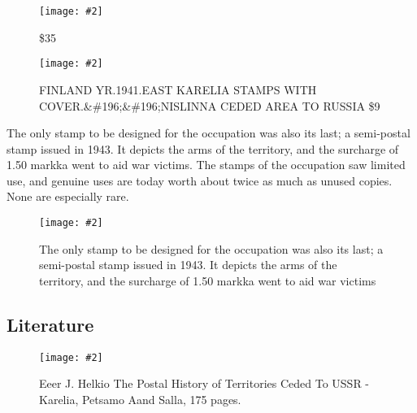 \documentclass[10pt,justified,oneside,a4paper]{tufte-book}     %
\newcommand{\ph}[3][1]{%
 \begin{figure}[htbp]
   \centering
   \texttt{[image: \#2]}%
    \caption{#3 }
 \end{figure}}
\begin{document}
\ph[width=.60\textwidth]{../eastern-karelia/eastern-karelia-stamps.jpg}{\$35 }

\ph[width=.60\textwidth]{../eastern-karelia/eastern-karelia-cover.jpg}{FINLAND YR.1941.EAST KARELIA STAMPS WITH COVER.&\#196;&\#196;NISLINNA CEDED AREA TO RUSSIA \$9}

The only stamp to be designed for the occupation was also its last; a semi-postal stamp issued in 1943. It depicts the arms of the territory, and the surcharge of 1.50 markka went to aid war victims.
The stamps of the occupation saw limited use, and genuine uses are today worth about twice as much as unused copies. None are especially rare.

\ph[width=.25\textwidth]{../eastern-karelia/semi-postal.jpg}{The only stamp to be designed for the occupation was also its last; a semi-postal stamp issued in 1943. It depicts the arms of the territory, and the surcharge of 1.50 markka went to aid war victims }

\subsection{Literature}

\ph[width=.35\textwidth]{../eastern-karelia/reference.jpg}{Eeer J. Helkio 
The Postal History of Territories Ceded 
To USSR - Karelia, Petsamo Aand Salla, 175 pages. }

                                                  
\end{document}
